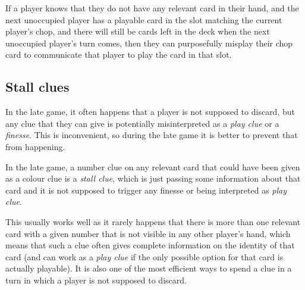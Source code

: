 \begin{convention}
	If a player knows that they do not have any relevant card in their hand, and the next unoccupied player has a playable card in the slot matching the current player's chop, and there will still be cards left in the deck when the next unoccupied player's turn comes, then they can purposefully misplay their chop card to communicate that player to play the card in that slot.
\end{convention}

\subsection{Stall clues}

In the late game, it often happens that a player is not supposed to discard, but any clue that they can give is potentially misinterpreted as a \emph{play clue} or a \emph{finesse}. This is inconvenient, so during the late game it is better to prevent that from happening.

\begin{convention}
	In the late game, a number clue on any relevant card that could have been given as a colour clue is a \emph{stall clue}, which is just passing some information about that card and it is not supposed to trigger any finesse or being interpreted as \emph{play clue}.
\end{convention}

This usually works well as it rarely happens that there is more than one relevant card with a given number that is not visible in any other player's hand, which means that such a clue often gives complete information on the identity of that card (and can work as a \emph{play clue} if the only possible option for that card is actually playable). It is also one of the most efficient ways to spend a clue in a turn in which a player is not supposed to discard.